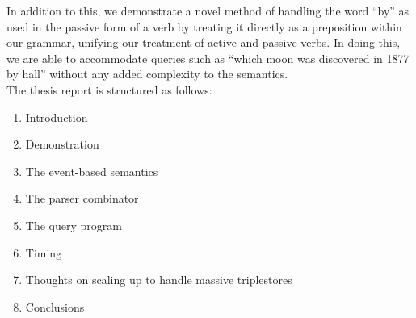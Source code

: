 \documentclass[../main.tex]{subfiles}
\begin{document}
In addition to this, we demonstrate a novel method of handling the word ``by'' as used in the passive form of a verb by treating it directly as a preposition within our grammar, unifying our treatment of active and passive verbs.  In doing this, we are able to accommodate queries such as ``which moon was discovered in 1877 by hall'' without any added complexity to the semantics.\\

The thesis report is structured as follows:

\begin{enumerate}
	\item Introduction
	\item Demonstration
	\item The event-based semantics
	\item The parser combinator
	\item The query program
	\item Timing
	\item Thoughts on scaling up to handle massive triplestores
	\item Conclusions
\end{enumerate}
\end{document}

